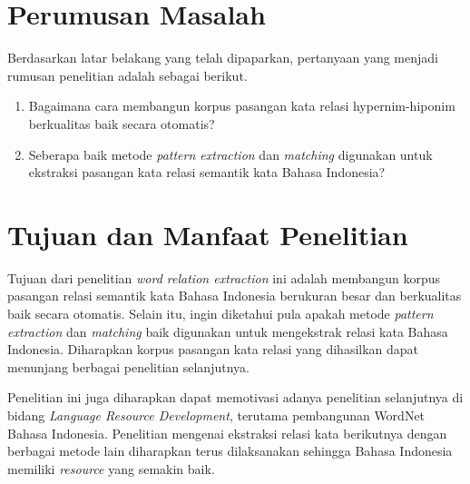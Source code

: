 \section{Perumusan Masalah}
Berdasarkan latar belakang yang telah dipaparkan, pertanyaan yang menjadi rumusan penelitian adalah sebagai berikut.
\begin{enumerate}
	\item Bagaimana cara membangun korpus pasangan kata relasi hypernim-hiponim berkualitas baik secara otomatis?
	\item Seberapa baik metode \textit{pattern extraction} dan \textit{matching} digunakan untuk ekstraksi pasangan kata relasi semantik kata Bahasa Indonesia?
\end{enumerate}

\section{Tujuan dan Manfaat Penelitian}
Tujuan dari penelitian \textit{word relation extraction} ini adalah membangun korpus pasangan relasi semantik kata Bahasa Indonesia berukuran besar dan berkualitas baik secara otomatis. Selain itu, ingin diketahui pula apakah metode \textit{pattern extraction} dan \textit{matching} baik digunakan untuk mengekstrak relasi kata Bahasa Indonesia. Diharapkan korpus pasangan kata relasi yang dihasilkan dapat menunjang berbagai penelitian selanjutnya.

Penelitian ini juga diharapkan dapat memotivasi adanya penelitian selanjutnya di bidang \textit{Language Resource Development}, terutama pembangunan WordNet Bahasa Indonesia. Penelitian mengenai ekstraksi relasi kata berikutnya dengan berbagai metode lain diharapkan terus dilaksanakan sehingga Bahasa Indonesia memiliki \textit{resource} yang semakin baik.

